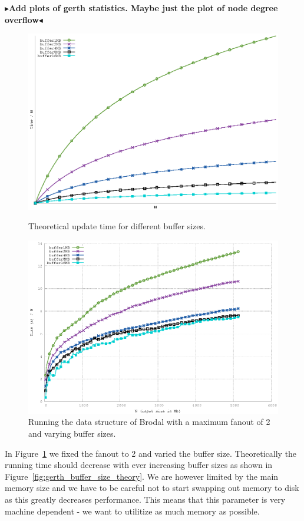 \documentclass[twoside,11pt,openright]{report}
\newcommand{\todo}[1]{{\color[rgb]{.5,0,0}\textbf{$\blacktriangleright$#1$\blacktriangleleft$}}}
\begin{document}
\todo{Add plots of gerth statistics. Maybe just the plot of node degree overflow}

\begin{figure}[htp]
\centering
\includegraphics[width=\textwidth]{../plots/gerth_update_buffer_size/gerth_buffer_size}
\caption{Theoretical update time for different buffer sizes.}
\label{fig:gerth_buffer_size_theory}

\includegraphics[width=\textwidth]{../src/experiments/gerth_buffer_size_experiment_results/2016-05-03.13_51_54/time}
\caption{Running the data structure of Brodal with a maximum fanout of 2 and varying buffer sizes.}
\label{fig:gerth_buffer_size_experiment}
\end{figure}

In Figure~\ref{fig:gerth_buffer_size_experiment} we fixed the fanout to 2 and varied the buffer size. Theoretically the running time should decrease with ever increasing buffer sizes as shown in Figure~\ref{fig:gerth_buffer_size_theory}. We are however limited by the main memory size and we have to be careful not to start swapping out memory to disk as this greatly decreases performance. This means that this parameter is very machine dependent - we want to utilitize as much memory as possible.
\end{document}
